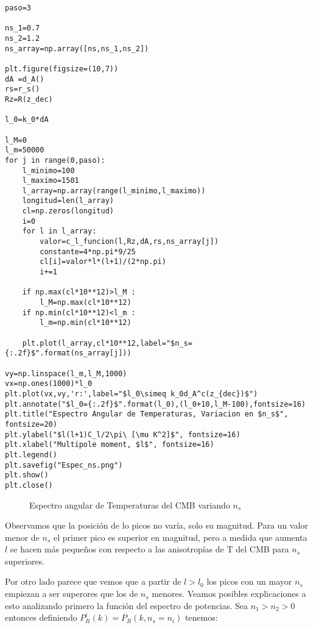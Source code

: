 \documentclass{article}
\begin{document}
\begin{lstlisting}[style=Python]
paso=3

ns_1=0.7
ns_2=1.2
ns_array=np.array([ns,ns_1,ns_2])

plt.figure(figsize=(10,7))
dA =d_A()
rs=r_s()
Rz=R(z_dec)

l_0=k_0*dA

l_M=0
l_m=50000
for j in range(0,paso):
    l_minimo=100
    l_maximo=1501
    l_array=np.array(range(l_minimo,l_maximo))
    longitud=len(l_array)
    cl=np.zeros(longitud)
    i=0    
    for l in l_array:
        valor=c_l_funcion(l,Rz,dA,rs,ns_array[j])
        constante=4*np.pi*9/25
        cl[i]=valor*l*(l+1)/(2*np.pi)
        i+=1
    
    if np.max(cl*10**12)>l_M : 
        l_M=np.max(cl*10**12)
    if np.min(cl*10**12)<l_m : 
        l_m=np.min(cl*10**12)
        
    plt.plot(l_array,cl*10**12,label="$n_s={:.2f}$".format(ns_array[j]))

vy=np.linspace(l_m,l_M,1000)
vx=np.ones(1000)*l_0
plt.plot(vx,vy,'r:',label="$l_0\simeq k_0d_A^c(z_{dec})$")
plt.annotate("$l_0={:.2f}$".format(l_0),(l_0+10,l_M-100),fontsize=16)
plt.title("Espectro Angular de Temperaturas, Variacion en $n_s$", fontsize=20)
plt.ylabel("$l(l+1)C_l/2\pi\ [\mu K^2]$", fontsize=16)
plt.xlabel("Multipole moment, $l$", fontsize=16)
plt.legend()
plt.savefig("Espec_ns.png")
plt.show()
plt.close()
\end{lstlisting}
 
 \begin{figure}[h]
    \begin{center}
    \end{center}
\caption{\label{fig:7} Espectro angular de Temperaturas del CMB variando $n_s$}
\end{figure}

Observamos que la posición de lo picos no varía, solo su magnitud. Para un valor menor de $n_s$ el primer pico es superior en magnitud, pero a medida que aumenta $l$ se hacen más pequeños con respecto a las anisotropías de T del CMB para $n_s$ superiores.

Por otro lado parece que vemos que a partir de $l>l_0$ los picos con un mayor $n_s$ empiezan a ser superores que los de $n_s$ menores. Veamos posibles explicaciones a esto analizando primero la función del espectro de potencias. Sea $n_1>n_2>0$ entonces definiendo $P_R^i(k)=P_R(k,n_s=n_i)$ tenemos:
\end{document}
